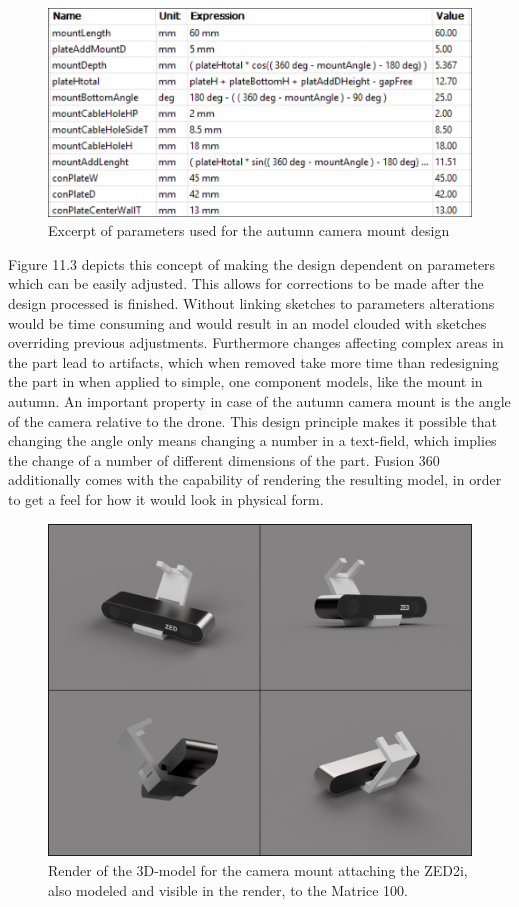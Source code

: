 \begin{figure}[h]
	\centering
	\includegraphics[width=0.7\linewidth]{img/Parameter}
	\caption{Excerpt of parameters used for the autumn camera mount design}
	\label{fig:custom_parts_parameter}
\end{figure}

Figure 11.3 depicts this concept of making the design dependent on parameters which can be easily adjusted. This allows for corrections to be made after the design processed is finished. Without linking sketches to parameters alterations would be time consuming and would result in an model clouded with sketches overriding previous adjustments. Furthermore changes affecting complex areas in the part lead to artifacts, which when removed take more time than redesigning the part in when applied to simple, one component models, like the mount in autumn. An important property in case of the autumn camera mount is the angle of the camera relative to the drone. This design principle makes it possible that changing the angle only means changing a number in a text-field, which implies the change of a number of different dimensions of the part. 
Fusion 360 additionally comes with the capability of rendering the resulting model, in order to get a feel for how it would look in physical form.

\begin{figure}[h]
	\centering
	\includegraphics[width=0.6\linewidth]{img/MountRender}
	\caption{Render of the 3D-model for the camera mount attaching the ZED2i, also modeled and visible in the render, to the Matrice 100.}
	\label{fig:custom_parts_mountRender}
\end{figure}

